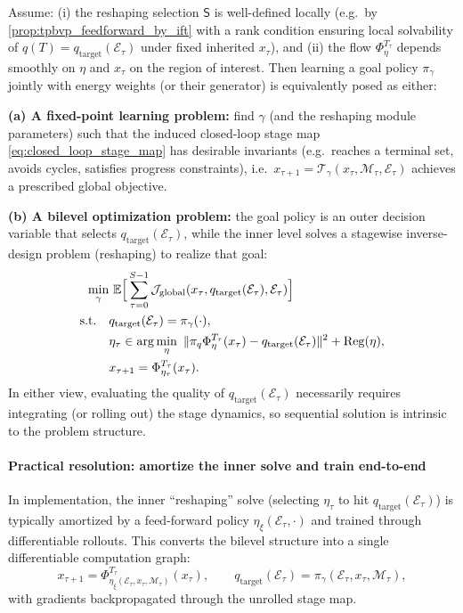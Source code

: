 \begin{proposition}
\label{prop:coupled_goal_and_energy}
Assume: (i) the reshaping selection $\mathsf S$ is well-defined locally (e.g.\ by \cref{prop:tpbvp_feedforward_by_ift} with a
rank condition ensuring local solvability of $q(T)=q_{\mathrm{target}}(\mathcal{E}_{\tau})$ under fixed inherited $x_\tau$),
and (ii) the flow $\Phi^{T_\tau}_{\eta}$ depends smoothly on $\eta$ and $x_\tau$ on the region of interest.
Then learning a goal policy $\pi_\gamma$ jointly with energy weights (or their generator) is equivalently posed as either:

\smallskip
\noindent\textbf{(a) A fixed-point learning problem:} find $\gamma$ (and the reshaping module parameters) such that the induced
closed-loop stage map \cref{eq:closed_loop_stage_map} has desirable invariants (e.g.\ reaches a terminal set, avoids cycles,
satisfies progress constraints), i.e.\ $x_{\tau+1}=\mathcal T_\gamma(x_\tau,\mathcal M_\tau,\mathcal E_\tau)$ achieves a
prescribed global objective.

\smallskip
\noindent\textbf{(b) A bilevel optimization problem:} the goal policy is an outer decision variable that selects $q_{\mathrm{target}}(\mathcal{E}_{\tau})$,
while the inner level solves a stagewise inverse-design problem (reshaping) to realize that goal:
\begin{equation}  
\begin{aligned}
\min_{\gamma}&\ \mathbb E\Big[\sum_{\tau=0}^{S-1} \mathcal J_{\rm global}(x_\tau,q_{\mathrm{target}}(\mathcal{E}_{\tau}),\mathcal E_\tau)\Big]
\\
\text{s.t.}\quad&
q_{\mathrm{target}}(\mathcal{E}_{\tau})=\pi_\gamma(\cdot), \\
&\eta_\tau\in\arg\min_{\eta}\ \|\pi_q\Phi^{T_\tau}_{\eta}(x_\tau)-q_{\mathrm{target}}(\mathcal{E}_{\tau})\|^2+\mathrm{Reg}(\eta),
\\ 
&x_{\tau+1}=\Phi^{T_\tau}_{\eta_\tau}(x_\tau).    
\end{aligned}
\end{equation}
In either view, evaluating the quality of $q_{\mathrm{target}}(\mathcal{E}_{\tau})$ necessarily requires integrating (or rolling out) the
stage dynamics, so sequential solution is intrinsic to the problem structure.
\end{proposition}

\paragraph{Practical resolution: amortize the inner solve and train end-to-end}
\label{rem:amortize_inner}
In implementation, the inner ``reshaping'' solve (selecting $\eta_\tau$ to hit $q_{\mathrm{target}}(\mathcal{E}_{\tau})$) is typically amortized
by a feed-forward policy $\eta_\xi(\mathcal E_\tau,\cdot)$ and trained through differentiable rollouts.
This converts the bilevel structure into a single differentiable computation graph:
\[
x_{\tau+1} = \Phi^{T_\tau}_{\eta_\xi(\mathcal E_\tau,x_\tau,\mathcal M_\tau)}(x_\tau),
\qquad
q_{\mathrm{target}}(\mathcal{E}_{\tau})=\pi_\gamma(\mathcal E_\tau,x_\tau,\mathcal M_\tau),
\]
with gradients backpropagated through the unrolled stage map.


